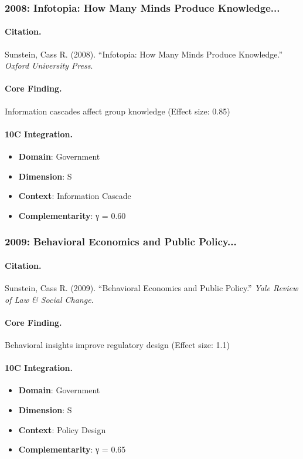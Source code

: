 \subsubsection{2008: Infotopia: How Many Minds Produce Knowledge...}

\paragraph{Citation.}
Sunstein, Cass R. (2008). ``Infotopia: How Many Minds Produce Knowledge.''
\textit{Oxford University Press}.

\paragraph{Core Finding.}
Information cascades affect group knowledge (Effect size: 0.85)

\paragraph{10C Integration.}
\begin{itemize}[nosep]
  \item \textbf{Domain}: Government
  \item \textbf{Dimension}: S
  \item \textbf{Context}: Information Cascade
  \item \textbf{Complementarity}: γ = 0.60
\end{itemize}

\subsubsection{2009: Behavioral Economics and Public Policy...}

\paragraph{Citation.}
Sunstein, Cass R. (2009). ``Behavioral Economics and Public Policy.''
\textit{Yale Review of Law & Social Change}.

\paragraph{Core Finding.}
Behavioral insights improve regulatory design (Effect size: 1.1)

\paragraph{10C Integration.}
\begin{itemize}[nosep]
  \item \textbf{Domain}: Government
  \item \textbf{Dimension}: S
  \item \textbf{Context}: Policy Design
  \item \textbf{Complementarity}: γ = 0.65
\end{itemize}

